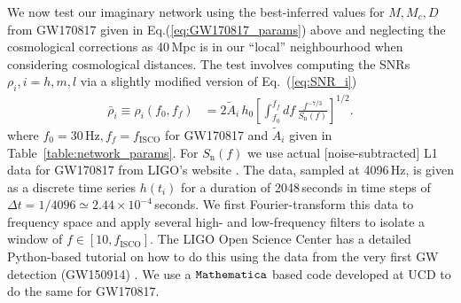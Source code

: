 \documentclass[11pt,a4paper]{article}
\newcommand{\f}{\frac}
\begin{document}
We now test our imaginary network using the best-inferred values for $M,M_c,D$ from GW170817 given in Eq.(\ref{eq:GW170817_params}) above and 
neglecting the cosmological corrections as 40\,Mpc is in our ``local'' neighbourhood when considering cosmological distances.
The test involves computing the SNRs $\rho_i, i=h,m,l$ via a slightly modified version of Eq.~(\ref{eq:SNR_i})
%
\begin{align}
\bar{\rho}_i\equiv\rho_i(f_0,f_f) &= 2\tilde{A}_i\, h_0\left[ \int_{f_0}^{f_f} df\, \f{f^{-7/3}}{S_\text{n}(f)}\right]^{1/2} \label{eq:SNR_i_with_fi}.
\end{align}
%
where $f_0 =30\,\text{Hz}, f_f= f_\text{ISCO}$ for GW170817 and $\tilde{A}_i$ given in Table~\ref{table:network_params}.
For $S_\text{n}(f)$ we use actual [noise-subtracted] L1 data for GW170817 from LIGO's website \cite{LIGO_L1_data}.
The data, sampled at 4096\,Hz, is given as a discrete time series $h(t_i)$ for a duration of 2048\,seconds in time steps of $\Delta t=1/4096\simeq 2.44\times 10^{-4}\,$seconds.
We first Fourier-transform this data to frequency space and apply several high- and low-frequency filters to isolate a window of $f\in [10, f_\text{ISCO}]$.
The LIGO Open Science Center has a detailed Python-based tutorial on how to do this using the data from the very first GW detection (GW150914) \cite{LIGO_tutorial}. 
We use a $\verb|Mathematica|$ based code developed at UCD to do the same for GW170817.
\end{document}
